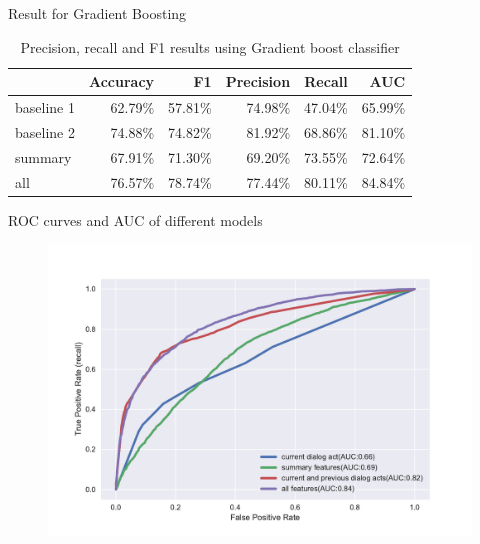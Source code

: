 \begin{frame}{Result for Gradient Boosting}
\begin{table}[ht!]
\begin{center}
\begin{tabular}{lrrrrr}
\hline
{}  &  Accuracy &        F1 &  Precision &    Recall &   AUC \\
\hline
baseline 1 &  62.79\% &  57.81\% &   74.98\% &  47.04\% &  65.99\% \\
baseline 2 &  74.88\% &  74.82\% &   81.92\% &  68.86\% &  81.10\% \\
summary    &  67.91\% &  71.30\% &   69.20\% &  73.55\% &  72.64\% \\
all        &  76.57\% &  78.74\% &   77.44\% &  80.11\% &  84.84\% \\
\hline
\end{tabular}
\end{center}
\caption{Precision, recall and F1 results using Gradient boost classifier }
\label{table:result2}
\end{table}
\end{frame}


\begin{frame}{ROC curves and AUC of different models}
\begin{figure}
 \centering
 \includegraphics[width=32em]{../scikitlearn/figures/roc.pdf}
 \end{figure}
\end{frame}


